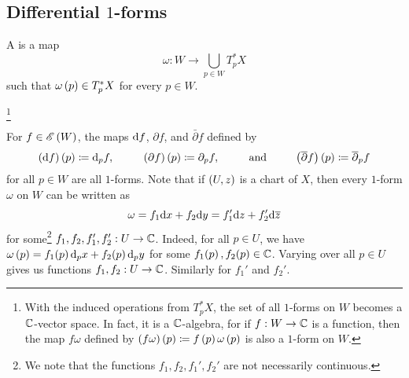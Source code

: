 \documentclass[../Moduli_Spaces_of_Riemann_Surfaces.tex]{subfiles}
\begin{document}
    \subsection{Differential $1$-forms}
    \begin{definition}
        A  is a map
        \begin{equation*}
            \omega:W\to\bigcup_{p\in W}T_p^\ast X
        \end{equation*}
        such that $\omega\left(p\right)\in T_p^\ast X$ for every $p\in W$.
    \end{definition}
    \footnote{With the induced operations from $T_p^\ast X$, the set of all $1$-forms on $W$ becomes a $\mathbb{C}$-vector space. In fact, it is a $\mathbb{C}$-algebra, for if $f:W\to\mathbb{C}$ is a function, then the map $f\omega$ defined by $\left(f\omega\right)\left(p\right)\coloneqq f\left(p\right)\omega\left(p\right)$ is also a $1$-form on $W$.}
    \vspace{-0.05in}
    \begin{example}
        For $f\in\mathscr{E}\left(W\right)$, the maps $\mathrm{d} f$, $\partial f$, and $\bar{\partial}f$ defined by
        \begin{equation*}
            \l(\d f\r)\l(p\r)\coloneqq\d_pf,\ \ \ \ \ \ \ \ \l(\partial f\r)\l(p\r)\coloneqq\partial_pf,\ \ \ \ \ \ \ \ \textrm{and}\ \ \ \ \ \ \ \ \big(\bar{\partial}f\big)\l(p\r)\coloneqq\bar{\partial}_pf
        \end{equation*}
        for all $p\in W$ are all $1$-forms. Note that if $\left(U,z\right)$ is a chart of $X$, then every $1$-form $\omega$ on $W$ can be written as
        \begin{equation*}
            \omega=f_1\mathrm{d} x+f_2\mathrm{d} y=f_1'\mathrm{d} z+f_2'\mathrm{d}\overline{z}
        \end{equation*}
        for some\footnote{We note that the functions $f_1,f_2,f_1',f_2'$ are not necessarily continuous.} $f_1,f_2,f_1',f_2':U\to\mathbb{C}$. Indeed, for all $p\in U$, we have $\omega\left(p\right)=f_1\!\left(p\right)\mathrm{d}_px+f_2\!\left(p\right)\mathrm{d}_py$ for some $f_1\!\left(p\right),f_2\!\left(p\right)\in\mathbb{C}$. Varying over all $p\in U$ gives us functions $f_1,f_2:U\to\mathbb{C}$. Similarly for $f_1'$ and $f_2'$.\exqed
    \end{example}
\end{document}
